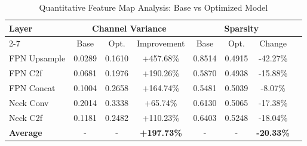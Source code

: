 \begin{table}[htbp]
\centering
\caption{Quantitative Feature Map Analysis: Base vs Optimized Model}
\label{tab:feature_statistics}
\begin{tabular}{lccccccc}
\hline
\textbf{Layer} & \multicolumn{3}{c}{\textbf{Channel Variance}} & \multicolumn{3}{c}{\textbf{Sparsity}} \\
\cline{2-7}
 & Base & Opt. & Improvement & Base & Opt. & Change \\
\hline
FPN Upsample & 0.0289 & 0.1610 & +457.68\% & 0.8514 & 0.4915 & -42.27\% \\
FPN C2f & 0.0681 & 0.1976 & +190.26\% & 0.5870 & 0.4938 & -15.88\% \\
FPN Concat & 0.1004 & 0.2658 & +164.74\% & 0.5481 & 0.5039 & -8.07\% \\
Neck Conv & 0.2014 & 0.3338 & +65.74\% & 0.6130 & 0.5065 & -17.38\% \\
Neck C2f & 0.1181 & 0.2482 & +110.23\% & 0.6403 & 0.5248 & -18.04\% \\
\hline
\textbf{Average} & - & - & \textbf{+197.73\%} & - & - & \textbf{-20.33\%} \\
\hline
\end{tabular}
\end{table}
